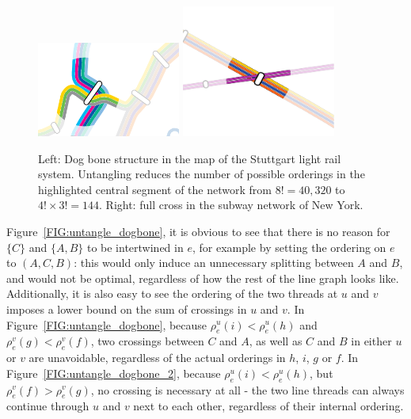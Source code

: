 \documentclass[format=acmsmall, review=false, screen=true]{acmart}
\begin{document}
\begin{figure}
  \centering
  \includegraphics[width=0.42\textwidth, page=1]{untangling/vvs_dogbone.pdf}
  \hfill
  \includegraphics[width=0.45\textwidth, page=1, trim={0.2cm 0.5cm 0.2cm 0.5cm}, clip]{untangling/ny_cross.pdf}
  \caption{Left: Dog bone structure in the map of the Stuttgart light rail system. Untangling reduces the number of possible orderings in the highlighted central segment of the network from $8! = 40,320$ to $4! \times 3! = 144$. Right: full cross in the subway network of New York.}  
  \label{FIG:untangle_dogbone_stuttgart}
\end{figure}

Figure~\ref{FIG:untangle_dogbone}, it is obvious to see that there is no reason for $\{C\}$ and $\{A, B\}$ to be intertwined in $e$, for example by setting the ordering on $e$ to $(A, C, B)$: this would only induce an unnecessary splitting between $A$ and $B$, and would not be optimal, regardless of how the rest of the line graph looks like.
Additionally, it is also easy to see the ordering of the two threads at $u$ and $v$ imposes a lower bound on the sum of crossings in $u$ and $v$.
In Figure~\ref{FIG:untangle_dogbone}, because $\rho^u_e(i) < \rho^u_e(h)$ and $\rho^v_e(g) < \rho^v_e(f)$, two crossings between $C$ and $A$, as well as $C$ and $B$ in either $u$ or $v$ are unavoidable, regardless of the actual orderings in $h$, $i$, $g$ or $f$.
In Figure~\ref{FIG:untangle_dogbone_2}, because $\rho^u_e(i) < \rho^u_e(h)$, but $\rho^v_e(f) > \rho^v_e(g)$, no crossing is necessary at all - the two line threads can always continue through $u$ and $v$ next to each other, regardless of their internal ordering. 
\end{document}
